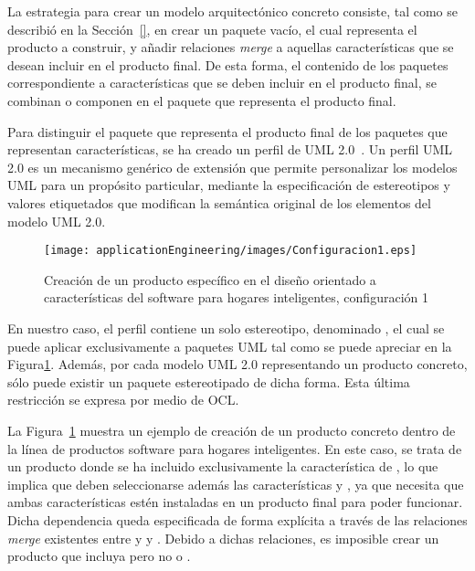 
La estrategia para crear un modelo arquitectónico concreto consiste, tal como se describió en la Sección~\ref{}, en crear un paquete vacío, el cual representa el producto a construir, y añadir relaciones \emph{merge} a aquellas características que se desean incluir en el producto final. De esta forma, el contenido de los paquetes correspondiente a características que se deben incluir en el producto final, se combinan o componen en el paquete que representa el producto final.

Para distinguir el paquete que representa el producto final de los paquetes que representan características, se ha creado un perfil de UML 2.0~\citep{omg:uml:2005}. Un perfil UML 2.0 es un mecanismo genérico de extensión que permite personalizar los modelos UML para un propósito particular, mediante la especificación de estereotipos y valores etiquetados que modifican la semántica original de los elementos del modelo UML 2.0.

\begin{figure}[!tb]
  \center
  \texttt{[image: applicationEngineering/images/Configuracion1.eps]} \\
  \caption{Creación de un producto específico en el diseño orientado a características del software para hogares inteligentes, configuración 1}
  \label{app:fig:conf1}
\end{figure}

En nuestro caso, el perfil contiene un solo estereotipo, denominado , el cual se puede aplicar exclusivamente a paquetes UML tal como se puede apreciar en la Figura\ref{app:fig:conf1}. Además, por cada modelo UML 2.0 representando un producto concreto, sólo puede existir un paquete estereotipado de dicha forma. Esta última restricción se expresa por medio de OCL.

La Figura~\ref{app:fig:conf1} muestra un ejemplo de creación de un producto concreto dentro de la línea de productos software para hogares inteligentes. En este caso, se trata de un producto donde se ha incluido exclusivamente la característica de , lo que implica que deben seleccionarse además las características  y , ya que  necesita que ambas características estén instaladas en un producto final para poder funcionar. Dicha dependencia queda especificada de forma explícita a través de las relaciones \emph{merge} existentes entre  y  y . Debido a dichas relaciones, es imposible crear un producto que incluya  pero no  o .

